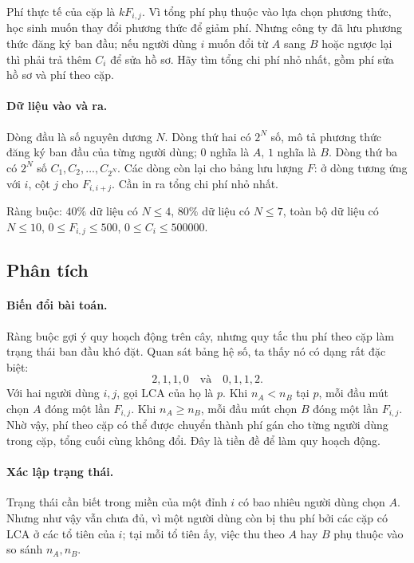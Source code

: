 \documentclass[11pt]{article}
\begin{document}
Phí thực tế của cặp là \(kF_{i,j}\). Vì tổng phí phụ thuộc vào lựa chọn
phương thức, học sinh muốn thay đổi phương thức để giảm phí. Nhưng công ty đã
lưu phương thức đăng ký ban đầu; nếu người dùng \(i\) muốn đổi từ \(A\) sang
\(B\) hoặc ngược lại thì phải trả thêm \(C_i\) để sửa hồ sơ. Hãy tìm tổng chi
phí nhỏ nhất, gồm phí sửa hồ sơ và phí theo cặp.

\paragraph{Dữ liệu vào và ra.}
Dòng đầu là số nguyên dương \(N\). Dòng thứ hai có \(2^N\) số, mô tả phương
thức đăng ký ban đầu của từng người dùng; \(0\) nghĩa là \(A\), \(1\) nghĩa
là \(B\). Dòng thứ ba có \(2^N\) số \(C_1,C_2,\ldots,C_{2^N}\). Các dòng còn
lại cho bảng lưu lượng \(F\): ở dòng tương ứng với \(i\), cột \(j\) cho
\(F_{i,i+j}\). Cần in ra tổng chi phí nhỏ nhất.

Ràng buộc: \(40\%\) dữ liệu có \(N\le 4\), \(80\%\) dữ liệu có \(N\le 7\),
toàn bộ dữ liệu có \(N\le 10\), \(0\le F_{i,j}\le 500\),
\(0\le C_i\le 500000\).

\subsection{Phân tích}

\paragraph{Biến đổi bài toán.}
Ràng buộc gợi ý quy hoạch động trên cây, nhưng quy tắc thu phí theo cặp làm
trạng thái ban đầu khó đặt. Quan sát bảng hệ số, ta thấy nó có dạng rất đặc
biệt:
\[
  2,1,1,0
  \quad\text{và}\quad
  0,1,1,2.
\]
Với hai người dùng \(i,j\), gọi LCA của họ là \(p\). Khi \(n_A<n_B\) tại
\(p\), mỗi đầu mút chọn \(A\) đóng một lần \(F_{i,j}\). Khi \(n_A\ge n_B\),
mỗi đầu mút chọn \(B\) đóng một lần \(F_{i,j}\). Nhờ vậy, phí theo cặp có thể
được chuyển thành phí gán cho từng người dùng trong cặp, tổng cuối cùng không
đổi. Đây là tiền đề để làm quy hoạch động.

\paragraph{Xác lập trạng thái.}
Trạng thái cần biết trong miền của một đỉnh \(i\) có bao nhiêu người dùng
chọn \(A\). Nhưng như vậy vẫn chưa đủ, vì một người dùng còn bị thu phí bởi
các cặp có LCA ở các tổ tiên của \(i\); tại mỗi tổ tiên ấy, việc thu theo
\(A\) hay \(B\) phụ thuộc vào so sánh \(n_A,n_B\).
\end{document}

